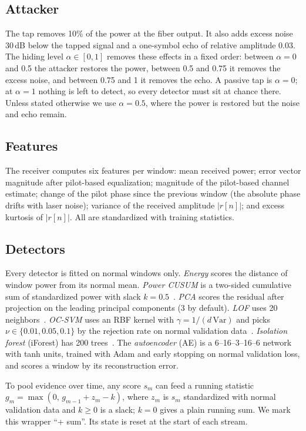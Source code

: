 \documentclass[conference]{IEEEtran}
\begin{document}
\subsection{Attacker}
The tap removes 10\% of the power at the fiber output. It also adds excess noise 30\,dB below the tapped signal and a one-symbol echo of relative amplitude 0.03. The hiding level $\alpha\in[0,1]$ removes these effects in a fixed order: between $\alpha=0$ and 0.5 the attacker restores the power, between 0.5 and 0.75 it removes the excess noise, and between 0.75 and 1 it removes the echo. A passive tap is $\alpha=0$; at $\alpha=1$ nothing is left to detect, so every detector must sit at chance there. Unless stated otherwise we use $\alpha=0.5$, where the power is restored but the noise and echo remain.

\subsection{Features}
The receiver computes six features per window: mean received power; error vector magnitude after pilot-based equalization; magnitude of the pilot-based channel estimate; change of the pilot phase since the previous window (the absolute phase drifts with laser noise); variance of the received amplitude $|r[n]|$; and excess kurtosis of $|r[n]|$. All are standardized with training statistics.

\subsection{Detectors}
Every detector is fitted on normal windows only. \emph{Energy} scores the distance of window power from its normal mean. \emph{Power CUSUM} is a two-sided cumulative sum of standardized power with slack $k=0.5$~\cite{basseville1993}. \emph{PCA} scores the residual after projection on the leading principal components (3 by default). \emph{LOF} uses 20 neighbors~\cite{breunig2000lof}. \emph{OC-SVM} uses an RBF kernel with $\gamma=1/(d\,\mathrm{Var})$ and picks $\nu\in\{0.01,0.05,0.1\}$ by the rejection rate on normal validation data~\cite{scholkopf2001ocsvm}. \emph{Isolation forest} (iForest) has 200 trees~\cite{liu2008iforest}. The \emph{autoencoder} (AE) is a 6--16--3--16--6 network with tanh units, trained with Adam and early stopping on normal validation loss, and scores a window by its reconstruction error.

To pool evidence over time, any score $s_m$ can feed a running statistic $g_m=\max(0,\,g_{m-1}+z_m-k)$, where $z_m$ is $s_m$ standardized with normal validation data and $k\ge0$ is a slack; $k=0$ gives a plain running sum. We mark this wrapper ``+ sum''. Its state is reset at the start of each stream.
\end{document}
